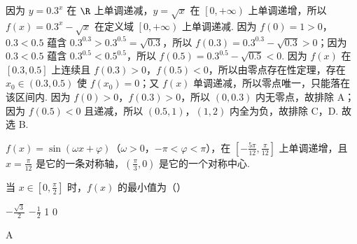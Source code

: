 \begin{solution}
因为 \(y=0.3^{x}\) 在 \(\R\) 上单调递减，\(y=\sqrt{x}\) 在 \(\left[ 0,+\infty \right)\) 上单调递增，所以 \(f\left( x \right)=0.3^{x}-\sqrt{x}\) 在定义域 \(\left[ 0,+\infty \right)\) 上单调递减. 因为 \(f\left( 0 \right)=1>0\)，\(0.3<0.5\) 蕴含 \(0.3^{0.3}>0.3^{0.5}=\sqrt{0.3}\)，所以 \(f\left( 0.3 \right)=0.3^{0.3}-\sqrt{0.3}>0\)；因为 \(0.3<0.5\) 蕴含 \(0.3^{0.5}<0.5^{0.5}\)，所以 \(f\left( 0.5 \right)=0.3^{0.5}-\sqrt{0.5}<0\). 因为 \(f\left( x \right)\) 在 \(\left[ 0.3,0.5 \right]\) 上连续且 \(f\left( 0.3 \right)>0\)，\(f\left( 0.5 \right)<0\)，所以由零点存在性定理，存在 \(x_{0}\in\left( 0.3,0.5 \right)\) 使 \(f\left( x_{0} \right)=0\)；又 \(f\left( x \right)\) 单调递减，所以零点唯一，只能落在该区间内. 因为 \(f\left( 0 \right)>0\)，\(f\left( 0.3 \right)>0\)，所以 \(\left( 0,0.3 \right)\) 内无零点，故排除 A；因为 \(f\left( 0.5 \right)<0\) 且递减，所以 \(\left( 0.5,1 \right)\)，\(\left( 1,2 \right)\) 内全为负，故排除 C，D. 故选 B.
\end{solution}

\begin{problem}
\(f(x)=\sin(\omega x+\varphi)\)（\(\omega>0\)，\(-\pi<\varphi<\pi\)），在 \(\left[-\frac{5\pi}{12},\frac{\pi}{12}\right]\) 上单调递增，且 \(x=\frac{\pi}{12}\) 是它的一条对称轴，\((\frac{\pi}{3},0)\) 是它的一个对称中心.

当 \(x\in[0,\frac{\pi}{2}]\) 时，\(f(x)\) 的最小值为（\quad）

\choices
    {\(-\frac{\sqrt3}{2}\)}
    {\(-\frac12\)}
    {1}
    {0}
\end{problem}

\begin{answer}
A
\end{answer}

